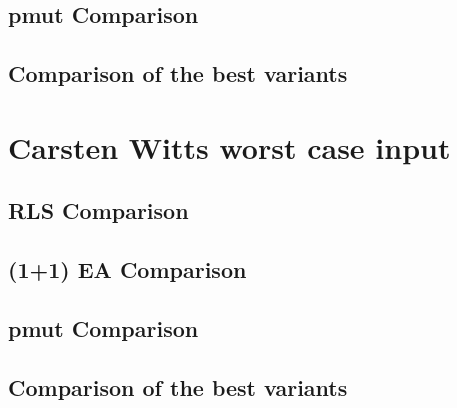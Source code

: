 


\subsection{pmut Comparison}





\subsection{Comparison of the best variants}





\section{Carsten Witts worst case input}

\subsection{RLS Comparison}





\subsection{(1+1) EA Comparison}





\subsection{pmut Comparison}





\subsection{Comparison of the best variants}




